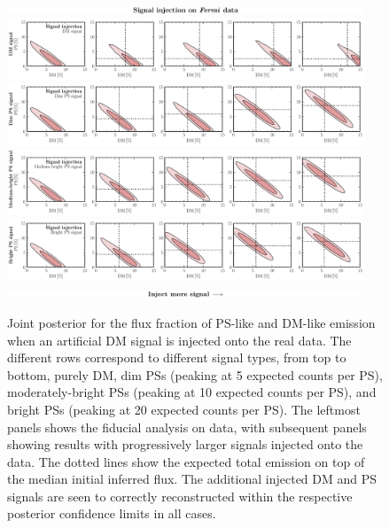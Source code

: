 \documentclass[prd,aps,10pt,nofootinbib,twocolumn,superscriptaddress,preprintnumbers,balancelastpage,longbibliography]{revtex4-1}
\begin{document}
%
\begin{figure}
    \centering
    \includegraphics[width=0.95\textwidth]{plots/sig_inj_title.pdf}
    \includegraphics[width=0.95\textwidth]{plots/data_sig_inj_dm.pdf}
    \includegraphics[width=0.95\textwidth]{plots/data_sig_inj_dim_ps.pdf}
    \includegraphics[width=0.95\textwidth]{plots/data_sig_inj_med_ps.pdf}
    \includegraphics[width=0.95\textwidth]{plots/data_sig_inj_ps.pdf}
    \includegraphics[width=0.95\textwidth]{plots/sig_inj_chyron.pdf}
    \caption{Joint posterior for the flux fraction of PS-like and DM-like emission when an artificial DM signal is injected onto the real \Fermi data. The different rows correspond to different signal types, from top to bottom, purely DM, dim PSs (peaking at 5 expected counts per PS), moderately-bright PSs (peaking at 10 expected counts per PS), and bright PSs (peaking at 20 expected counts per PS). The leftmost panels shows the fiducial analysis on \Fermi data, with subsequent panels showing results with progressively larger signals injected onto the data. The dotted lines show the expected total emission on top of the median initial inferred flux. The additional injected DM and PS signals are seen to correctly reconstructed within the respective posterior confidence limits in all cases.}
    \label{fig:sig_inj_data}
\end{figure}
%
\end{document}
